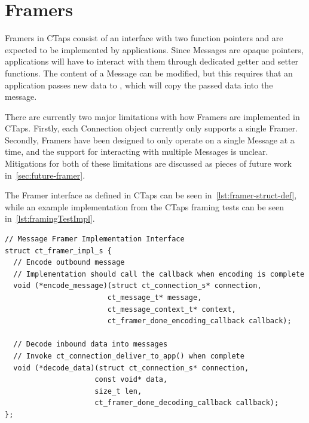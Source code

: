 \section{Framers}\label{sec:framer-impl}
Framers in CTaps consist of an interface with two function
pointers and are expected to be implemented by applications.
Since Messages are opaque pointers, applications will have to interact
with them through dedicated getter and setter functions. The content
of a Message can be modified, but this requires that an application
passes new data to , which will
copy the passed data into the message.

There are currently two major limitations with how Framers are implemented
in CTaps. Firstly, each Connection object currently only supports a single
Framer. Secondly, Framers have been designed to only operate on a single Message
at a time, and the support for interacting with multiple Messages is unclear.
Mitigations for both of these limitations are discussed as
pieces of future work in~\cref{sec:future-framer}.

The Framer interface as defined in CTaps can be seen in~\cref{lst:framer-struct-def},
while an example implementation from the CTaps framing tests can be seen in~\cref{lst:framingTestImpl}.

\begin{listing}[htbp]
\begin{verbatim}
// Message Framer Implementation Interface
struct ct_framer_impl_s {
  // Encode outbound message
  // Implementation should call the callback when encoding is complete
  void (*encode_message)(struct ct_connection_s* connection,
                        ct_message_t* message,
                        ct_message_context_t* context,
                        ct_framer_done_encoding_callback callback);

  // Decode inbound data into messages
  // Invoke ct_connection_deliver_to_app() when complete
  void (*decode_data)(struct ct_connection_s* connection,
                     const void* data,
                     size_t len,
                     ct_framer_done_decoding_callback callback);
};
\end{verbatim}
\caption[Framer structure definition]{Framer structure definition from ctaps.h.}
\label{lst:framer-struct-def}
\end{listing}

